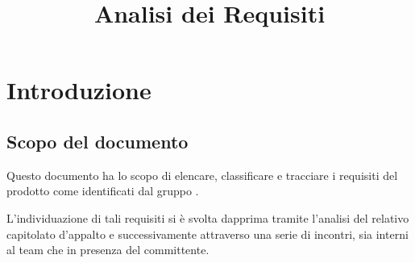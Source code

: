 


\author{\AZ}
\supervisor{\GG}
\dest{\TV, \RC, \ZU}
\title{Analisi dei Requisiti}


\maketitle

\tableofcontents
\listoffigures



\newcommand{\myimg}[1] {
	\begin{figure}[H]
		\makebox[\textwidth][c] {
			\texttt{[image: Diagrammi casi d'uso/\#1]}
		}
		\caption{#1}
		\label{#1}
	\end{figure}
}

\newcommand{\myimgsmall}[1] {
	\begin{figure}[H]
		\makebox[\textwidth][c] {
			\texttt{[image: Diagrammi casi d'uso/\#1]}
		}
		\caption{#1}
		\label{#1}
	\end{figure}
}

\newcommand{\myimgvsmall}[1] {
	\begin{figure}[H]
		\makebox[\textwidth][c] {
			\texttt{[image: Diagrammi casi d'uso/\#1]}
		}
		\caption{#1}
		\label{#1}
	\end{figure}
}






\section{Introduzione}

\subsection{Scopo del documento}
Questo documento ha lo scopo di elencare, classificare e tracciare i requisiti del prodotto \proj{} come identificati dal gruppo \hx{}.

L'individuazione di tali requisiti si è svolta dapprima tramite l'analisi del relativo capitolato d'appalto e successivamente attraverso una serie di incontri, sia interni al team che in presenza del committente.

